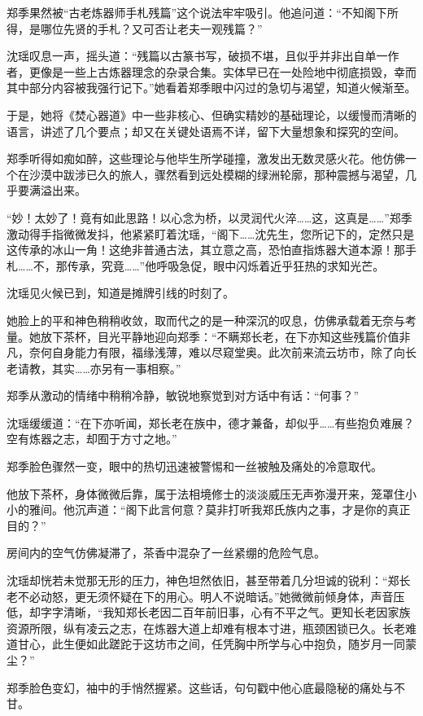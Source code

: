 郑季果然被“古老炼器师手札残篇”这个说法牢牢吸引。他追问道：“不知阁下所得，是哪位先贤的手札？又可否让老夫一观残篇？”

沈瑶叹息一声，摇头道：“残篇以古篆书写，破损不堪，且似乎并非出自单一作者，更像是一些上古炼器理念的杂录合集。实体早已在一处险地中彻底损毁，幸而其中部分内容被我强行记下。”她看着郑季眼中闪过的急切与渴望，知道火候渐至。

于是，她将《焚心器道》中一些非核心、但确实精妙的基础理论，以缓慢而清晰的语言，讲述了几个要点；却又在关键处语焉不详，留下大量想象和探究的空间。

郑季听得如痴如醉，这些理论与他毕生所学碰撞，激发出无数灵感火花。他仿佛一个在沙漠中跋涉已久的旅人，骤然看到远处模糊的绿洲轮廓，那种震撼与渴望，几乎要满溢出来。

“妙！太妙了！竟有如此思路！以心念为桥，以灵润代火淬……这，这真是……”郑季激动得手指微微发抖，他紧紧盯着沈瑶，“阁下……沈先生，您所记下的，定然只是这传承的冰山一角！这绝非普通古法，其立意之高，恐怕直指炼器大道本源！那手札……不，那传承，究竟……”他呼吸急促，眼中闪烁着近乎狂热的求知光芒。

沈瑶见火候已到，知道是摊牌引线的时刻了。

她脸上的平和神色稍稍收敛，取而代之的是一种深沉的叹息，仿佛承载着无奈与考量。她放下茶杯，目光平静地迎向郑季：“不瞒郑长老，在下亦知这些残篇价值非凡，奈何自身能力有限，福缘浅薄，难以尽窥堂奥。此次前来流云坊市，除了向长老请教，其实……亦另有一事相察。”

郑季从激动的情绪中稍稍冷静，敏锐地察觉到对方话中有话：“何事？”

沈瑶缓缓道：“在下亦听闻，郑长老在族中，德才兼备，却似乎……有些抱负难展？空有炼器之志，却囿于方寸之地。”

郑季脸色骤然一变，眼中的热切迅速被警惕和一丝被触及痛处的冷意取代。

他放下茶杯，身体微微后靠，属于法相境修士的淡淡威压无声弥漫开来，笼罩住小小的雅间。他沉声道：“阁下此言何意？莫非打听我郑氏族内之事，才是你的真正目的？”

房间内的空气仿佛凝滞了，茶香中混杂了一丝紧绷的危险气息。

沈瑶却恍若未觉那无形的压力，神色坦然依旧，甚至带着几分坦诚的锐利：“郑长老不必动怒，更无须怀疑在下的用心。明人不说暗话。”她微微前倾身体，声音压低，却字字清晰，“我知郑长老因二百年前旧事，心有不平之气。更知长老因家族资源所限，纵有凌云之志，在炼器大道上却难有根本寸进，瓶颈困锁已久。长老难道甘心，此生便如此蹉跎于这坊市之间，任凭胸中所学与心中抱负，随岁月一同蒙尘？”

郑季脸色变幻，袖中的手悄然握紧。这些话，句句戳中他心底最隐秘的痛处与不甘。

